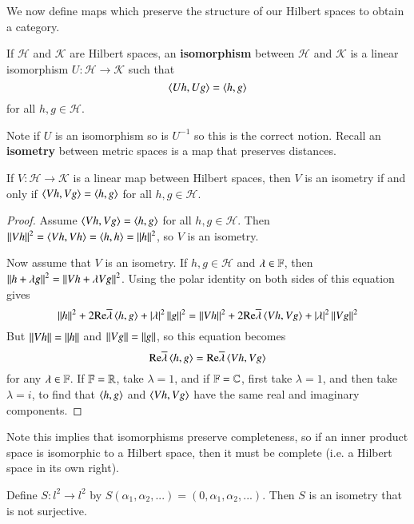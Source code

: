 We now define maps which preserve the structure of our Hilbert spaces to obtain a category.

\begin{defn}
    If $\mathscr{H}$ and $\mathscr{K}$ are Hilbert spaces, an \textbf{isomorphism} between $\mathscr{H}$ and $\mathscr{K}$ is a linear isomorphism $U:\mathscr{H}\rightarrow \mathscr{K}$ such that $$\left\langle Uh, Ug\right\rangle = \left\langle h, g\right\rangle$$
    for all $h,g \in \mathscr{H}$.
\end{defn}

Note if $U$ is an isomorphism so is $U^{-1}$ so this is the correct notion. Recall an \textbf{isometry} between metric spaces is a map that preserves distances.

\begin{prop}
    If $V:\mathscr{H}\rightarrow \mathscr{K}$ is a linear map between Hilbert spaces, then $V$ is an isometry if and only if $\left\langle Vh, Vg\right\rangle = \left\langle h, g\right\rangle$ for all $h,g \in\mathscr{H}$.
\end{prop}
\begin{proof}
    Assume $\left\langle Vh, Vg\right\rangle = \left\langle h, g\right\rangle$ for all $h,g \in \mathscr{H}$. Then $\left|\left| Vh\right|\right|^2 = \left\langle Vh, Vh\right\rangle = \left\langle h, h\right\rangle = \left|\left| h\right|\right|^2$, so $V$ is an isometry.

    Now assume that $V$ is an isometry. If $h,g \in \mathscr{H}$ and $\lambda \in \mathbb F$, then $\left|\left| h+\lambda g\right|\right|^2 = \left|\left| Vh+\lambda Vg\right|\right|^2$. Using the polar identity on both sides of this equation gives $$\left|\left| h\right|\right|^2+2\text{Re}\overline{\lambda}\left\langle h, g\right\rangle+|\lambda|^2\left|\left| g\right|\right|^2 = \left|\left| Vh\right|\right|^2 + 2\text{Re}\overline{\lambda}\left\langle Vh, Vg\right\rangle + |\lambda|^2\left|\left| Vg\right|\right|^2$$
    But $\left|\left| Vh\right|\right| = \left|\left| h\right|\right|$ and $\left|\left| Vg\right|\right| = \left|\left| g\right|\right|$, so this equation becomes $$\text{Re}\overline{\lambda}\left\langle h, g\right\rangle = \text{Re}\overline{\lambda}\left\langle Vh, Vg\right\rangle$$
    for any $\lambda \in \mathbb F$. If $\mathbb F = \mathbb R$, take $\lambda = 1$, and if $\mathbb F = \mathbb C$, first take $\lambda = 1$, and then take $\lambda = i$, to find that $\left\langle h, g\right\rangle$ and $\left\langle Vh, Vg\right\rangle$ have the same real and imaginary components.
\end{proof}

Note this implies that isomorphisms preserve completeness, so if an inner product space is isomorphic to a Hilbert space, then it must be complete (i.e. a Hilbert space in its own right).

\begin{eg}
    Define $S:l^2\rightarrow l^2$ by $S(\alpha_1,\alpha_2,...) = (0,\alpha_1,\alpha_2,...)$. Then $S$ is an isometry that is not surjective.
\end{eg}

